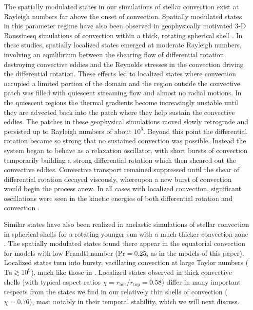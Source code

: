 The spatially modulated states in our simulations of stellar
convection exist at Rayleigh numbers far above the onset of
convection.  Spatially modulated states in this parameter regime have
also been observed in geophysically motivated 3-D Boussinesq simulations of
convection within a thick, rotating spherical shell
\citep{Grote&Busse_2000, Busse_2002, Busse_Simitev_2005}. In these
studies, spatially localized states emerged at moderate Rayleigh
numbers, involving an equilibrium between the shearing flow of
differential rotation destroying convective eddies and the Reynolds
stresses in the convection driving the differential rotation.  These
effects led to localized states where convection occupied a limited
portion of the domain and the region outside the convective patch was
filled with quiescent streaming flow and almost no radial motions.  In
the quiescent regions the thermal gradients become increasingly
unstable until they are advected back into the patch where they help
sustain the convective eddies.  The patches in these geophysical
simulations moved slowly retrograde and persisted up to Rayleigh
numbers of about $10^6$.  Beyond this point the differential rotation
became so strong that no sustained convection was possible.  Instead
the system began to behave as a relaxation oscillator, with short
bursts of convection temporarily building a strong differential
rotation which then sheared out the convective eddies.  Convective
transport remained suppressed until the shear of differential rotation
decayed viscously, whereupon a new burst of convection would begin the
process anew.  In all cases with localized convection, significant
oscillations were seen in the kinetic energies of both differential
rotation and convection \citep{Grote&Busse_2000}.

 
Similar states have also been realized in anelastic simulations of
stellar convection in spherical shells for a rotating younger sun with
a much thicker convection zone
\citep{Ballot_et_al_2006,Ballot_et_al_2007}.  The spatially modulated
states found there appear in the equatorial convection for models with
low Prandtl number ($\mathrm{Pr}=0.25$, as in the models of this paper).
Localized states turn into bursty, vacillating convection at large
Taylor numbers ($\mathrm{Ta} \gtrsim 10^9$), much like those in
\cite{Grote&Busse_2000}.  Localized states observed in thick
convective shells (with typical aspect ratios $\chi =
r_\mathrm{bot}/r_\mathrm{top}=0.58$) differ in many important respects
from the states we find in our relatively thin shells of convection
($\chi = 0.76$), most notably in their temporal stability, which we
will next discuss.

